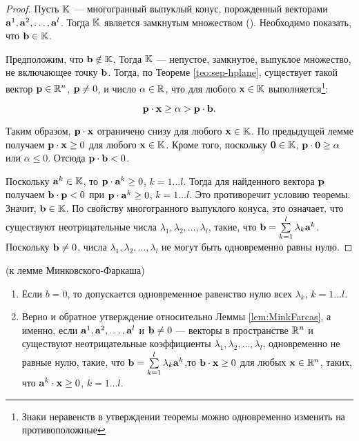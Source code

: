 \begin{proof}

Пусть $\mathbb{K}$ --- многогранный выпуклый конус, порожденный
векторами $\mathbf{a}^1, \mathbf{a}^2, \ldots, \mathbf{a}^l$. Тогда $\mathbb{K}$
является замкнутым множеством (). Необходимо
показать, что $\mathbf{b} \in \mathbb{K}$.

Предположим, что $\mathbf{b} \notin \mathbb{K}$. Тогда $\mathbb{K}$ ---
непустое, замкнутое, выпуклое множество, не включающее точку
$\mathbf{b}$. Тогда, по Теореме \ref{teo:sep-hplane}, существует такой
вектор $\mathbf{p} \in \mathbb{R}^n$, $\mathbf{p} \neq 0$, и число $\alpha \in \mathbb{R}$,
что для любого $\mathbf{x} \in \mathbb{K}$ выполняется\footnote{Знаки
неравенств в утверждении теоремы можно одновременно изменить на
противоположные}:

\[\mathbf{p} \cdot \mathbf{x} \geq \alpha > \mathbf{p} \cdot \mathbf{b}.\]

Таким образом, $\mathbf{p} \cdot \mathbf{x}$ ограничено снизу для любого
$\mathbf{x} \in \mathbb{K}$. По предыдущей лемме получаем $\mathbf{p} \cdot
\mathbf{x} \geq 0$ для любого $\mathbf{x} \in \mathbb{K}$. Кроме того, поскольку
$\mathbf{0} \in \mathbb{K}$, $\mathbf{p} \cdot \mathbf{0} \geq \alpha$ или $\alpha
\leq 0$. Отсюда $\mathbf{p} \cdot \mathbf{b} < 0$.

Поскольку $\mathbf{a}^k \in \mathbb{K}$, то $\mathbf{p} \cdot \mathbf{a}^k \geq 0$,
$k=1 \ldots l$. Тогда для найденного вектора $\mathbf{p}$ получаем
$\mathbf{b} \cdot \mathbf{p} < 0$ при $\mathbf{p} \cdot \mathbf{a}^k \geq 0$, $k=1
\ldots l$. Это противоречит условию теоремы. Значит, $\mathbf{b} \in
\mathbb{K}$. По свойству многогранного выпуклого конуса, это означает,
что существуют неотрицательные числа $\lambda_1, \lambda_2, \ldots,
\lambda_l$, такие, что $\mathbf{b}=\sum\limits_{k=1}^l{\lambda_k
\mathbf{a}^k}$. Поскольку $\mathbf{b}\neq0$, числа $\lambda_1, \lambda_2,
\ldots, \lambda_l$ не могут быть одновременно равны нулю.


\end{proof}


\begin{note}(к лемме Минковского-Фаркаша)

\begin{enumerate}
\renewcommand{\theenumi}{(\alph{enumi})}

  \item Если $b=0$, то допускается одновременное равенство нулю всех
  $\lambda_k$, $k=1 \ldots l$.

  \item Верно и обратное утверждение относительно Леммы \ref{lem:MinkFarcas},
  а именно, если $\mathbf{a}^1, \mathbf{a}^2, \ldots, \mathbf{a}^l$ и $\mathbf{b}\neq0$
  ---  векторы в пространстве $\mathbb{R}^n$ и существуют неотрицательные
   коэффициенты $\lambda_1, \lambda_2, \ldots, \lambda_l$,
   одновременно не равные нулю, такие, что $\mathbf{b}=\sum\limits_{k=1}^l{\lambda_k
   \mathbf{a}^k}$,то $\mathbf{b} \cdot \mathbf{x} \geq 0$ для любых $\mathbf{x} \in \mathbb{R}^n$, таких,
   что $\mathbf{a}^k \cdot \mathbf{x} \geq 0$, $k=1 \ldots l$.

\end{enumerate}

\end{note}


